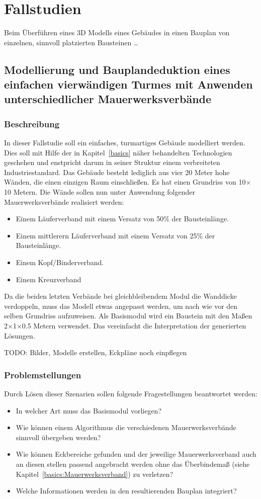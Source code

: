 \chapter{Fallstudien}\label{scenarios}
Beim Überführen eines 3D Modells eines Gebäudes in einen Bauplan von einzelnen, sinnvoll platzierten Bausteinen \dots
\section{Modellierung und Bauplandeduktion eines einfachen vierwändigen Turmes mit Anwenden unterschiedlicher Mauerwerksverbände}\label{scenarios:scenario1}
\subsection*{Beschreibung}
In dieser Fallstudie soll ein einfaches, turmartiges Gebäude modelliert werden.
Dies soll mit Hilfe der in Kapitel~\ref{basics} näher behandelten Technologien geschehen und enstpricht darum in seiner Struktur einem verbreiteten Industriestandard.
Das Gebäude besteht lediglich aus vier 20 Meter hohe Wänden, die einen einzigen Raum einschließen.
Es hat einen Grundriss von 10$\times$10 Metern.
Die Wände sollen nun unter Anwendung folgender Mauerwerksverbände realisiert werden:
\begin{itemize}
  \item Einem Läuferverband mit einem Versatz von 50\% der Bausteinlänge.
  \item Einem mittlerern Läuferverband mit einem Versatz von 25\% der Bausteinlänge.
  \item Einem Kopf/Binderverband.
  \item Einem Kreuzverband 
\end{itemize}
Da die beiden letzten Verbände bei gleichbleibendem Modul die Wanddicke verdoppeln, muss das Modell etwas angepasst werden, um nach wie vor den selben Grundriss aufzuweisen.
Als Basismodul wird ein Baustein mit den Maßen 2$\times$1$\times$0.5 Metern verwendet.
Das vereinfacht die Interpretation der generierten Lösungen.

TODO: Bilder, Modelle erstellen, Eckpläne noch einpflegen

\subsection*{Problemstellungen}
Durch Lösen dieser Szenarien sollen folgende Fragestellungen beantwortet werden:
\begin{itemize}
  \item In welcher Art muss das Basismodul vorliegen?
  \item Wie können einem Algorithmus die verschiedenen Mauerwerksverbände sinnvoll übergeben werden?
  \item Wie können Eckbereiche gefunden und der jeweilige Mauerwerksverband auch an diesen stellen passend angebracht werden ohne das Überbindemaß (siehe Kapitel~\ref{basics:Mauerwerksverband}) zu verletzen?
  \item Welche Informationen werden in den resultierenden Bauplan integriert?
\end{itemize}

